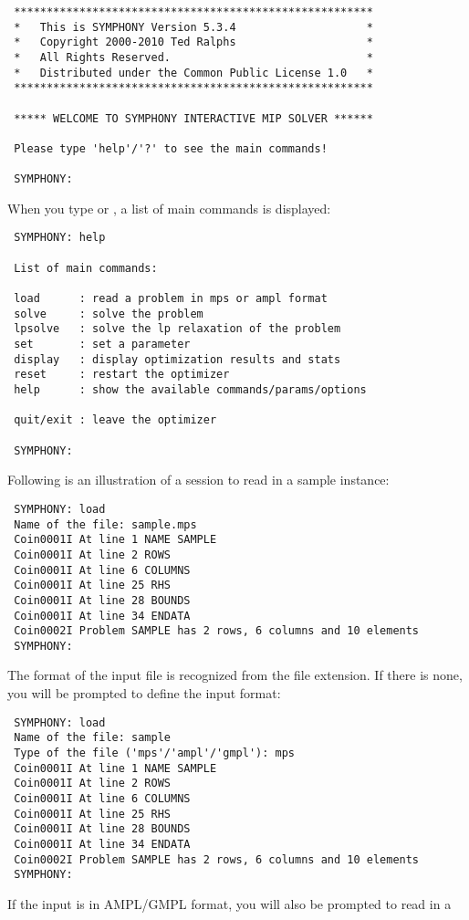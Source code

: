 {\color{Brown}
\begin{verbatim}
 *******************************************************
 *   This is SYMPHONY Version 5.3.4                    *
 *   Copyright 2000-2010 Ted Ralphs                    *
 *   All Rights Reserved.                              *
 *   Distributed under the Common Public License 1.0   *
 *******************************************************

 ***** WELCOME TO SYMPHONY INTERACTIVE MIP SOLVER ******

 Please type 'help'/'?' to see the main commands!

 SYMPHONY:
\end{verbatim}
}
When you type  or , a list of main commands is displayed:
{\color{Brown}
\begin{verbatim}
 SYMPHONY: help

 List of main commands:

 load      : read a problem in mps or ampl format
 solve     : solve the problem
 lpsolve   : solve the lp relaxation of the problem
 set       : set a parameter
 display   : display optimization results and stats
 reset     : restart the optimizer
 help      : show the available commands/params/options

 quit/exit : leave the optimizer

 SYMPHONY:
\end{verbatim}
}
Following is an illustration of a session to read in a sample instance:
{\color{Brown}
\begin{verbatim}
 SYMPHONY: load 
 Name of the file: sample.mps
 Coin0001I At line 1 NAME SAMPLE
 Coin0001I At line 2 ROWS
 Coin0001I At line 6 COLUMNS
 Coin0001I At line 25 RHS
 Coin0001I At line 28 BOUNDS
 Coin0001I At line 34 ENDATA
 Coin0002I Problem SAMPLE has 2 rows, 6 columns and 10 elements
 SYMPHONY: 
\end{verbatim}
}
The format of the input file is recognized from the file extension. If there is
none, you will be prompted to define the input format: 
{\color{Brown}
\begin{verbatim}
 SYMPHONY: load 
 Name of the file: sample
 Type of the file ('mps'/'ampl'/'gmpl'): mps 
 Coin0001I At line 1 NAME SAMPLE
 Coin0001I At line 2 ROWS
 Coin0001I At line 6 COLUMNS
 Coin0001I At line 25 RHS
 Coin0001I At line 28 BOUNDS
 Coin0001I At line 34 ENDATA
 Coin0002I Problem SAMPLE has 2 rows, 6 columns and 10 elements
 SYMPHONY: 
\end{verbatim}
} 
If the input is in AMPL/GMPL format, you will also be prompted to read in a
